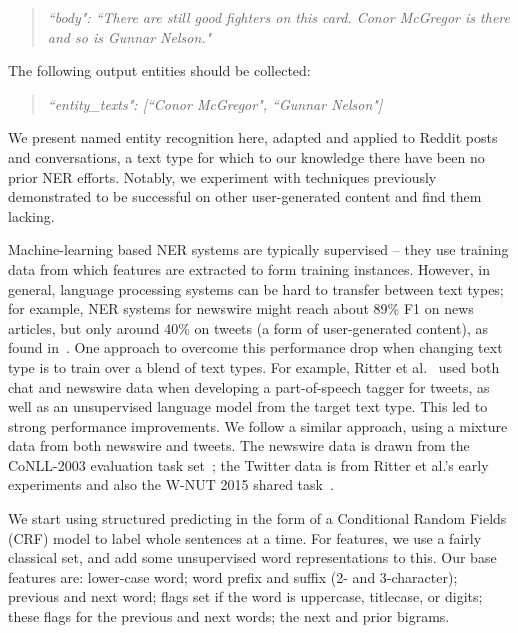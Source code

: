 \documentclass[acmsmall]{acmart}
\begin{document}
\begin{quote}
\emph{``body": ``There are still good fighters on this card. Conor McGregor is there and so is Gunnar Nelson."}
\end{quote}

The following output entities should be collected:

\begin{quote}
\emph{``entity\_texts": [``Conor McGregor", ``Gunnar Nelson"]}
\end{quote}

We present named entity recognition here, adapted and applied to Reddit posts and conversations, a text type for which to our knowledge there have been no prior NER efforts.
Notably, we experiment with techniques previously demonstrated to be successful on other user-generated content and find them lacking.

Machine-learning based NER systems are typically supervised -- they use training data from which features are extracted to form training instances.
However, in general, language processing systems can be hard to transfer between text types; for example, NER systems for newswire might reach about 89\% F1 on news articles, but only around 40\% on tweets (a form of user-generated content), as found in~\cite{derczynski2015analysis}.
One approach to overcome this performance drop when changing text type is to train over a blend of text types.
For example, Ritter et al.~\cite{ritter2011named} used both chat %
and newswire data when developing a part-of-speech tagger for tweets, as well as an unsupervised language model from the target text type.
This led to strong performance improvements.
We follow a similar approach, using a mixture data from both newswire and tweets.
The newswire data is drawn from the CoNLL-2003 evaluation task set~\cite{tjong2003introduction}; the Twitter data is from Ritter et al.'s early experiments and also the W-NUT 2015 shared task~\cite{ritter2011named,baldwin2015shared}.

We start using structured predicting in the form of a Conditional Random Fields (CRF) model to label whole sentences at a time.
For features, we use a fairly classical set, and add some unsupervised word representations to this.
Our base features are: lower-case word; word prefix and suffix (2- and 3-character); previous and next word; flags set if the word is uppercase, titlecase, or digits; these flags for the previous and next words; the next and prior bigrams.
\end{document}
